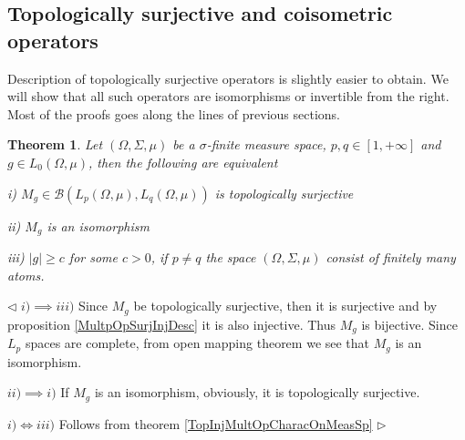 \documentclass[12pt]{article}
\newtheorem{theorem}{Theorem}[subsection]
\newenvironment{proof}{\par $\triangleleft$}{$\triangleright$}
\begin{document}
\subsection{Topologically surjective and coisometric operators}

Description of topologically surjective operators is slightly easier to obtain. We will show that all such operators are isomorphisms or invertible from the right. Most of the proofs goes along the lines of previous sections.

\begin{theorem}\label{TopSurMultOpCharacOnMeasSp} Let $(\Omega,\Sigma,\mu)$ be a $\sigma$-finite measure space, $p,q\in[1,+\infty]$ and $g\in L_0(\Omega,\mu)$, then the following are equivalent

i) $M_g\in\mathcal{B}(L_p(\Omega,\mu),L_q(\Omega,\mu))$ is topologically surjective

ii) $M_g$ is an isomorphism

iii) $|g|\geq c$ for some $c>0$, if $p\neq q$ the space $(\Omega,\Sigma,\mu)$ consist of finitely many atoms.
\end{theorem}
\begin{proof} $i)\implies iii)$ Since $M_g$ be topologically surjective, then it is surjective and by proposition \ref{MultpOpSurjInjDesc} it is also injective. Thus $M_g$ is bijective. Since $L_p$ spaces are complete, from open mapping theorem we see that $M_g$ is an isomorphism.

$ii)\implies i)$ If $M_g$ is an isomorphism, obviously, it is topologically surjective.

$i)\Longleftrightarrow iii)$ Follows from theorem \ref{TopInjMultOpCharacOnMeasSp}
\end{proof}
\end{document}
